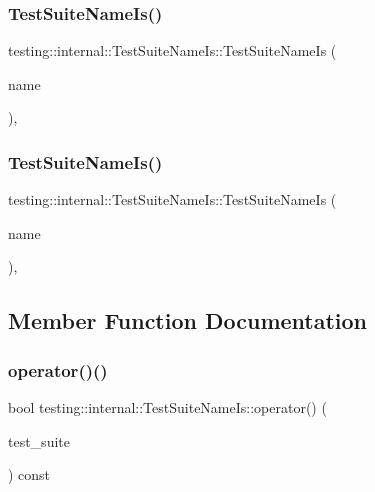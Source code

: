 \subsubsection{\texorpdfstring{TestSuiteNameIs()}{TestSuiteNameIs()}\hspace{0.1cm}{\footnotesize\ttfamily [1/2]}}
{\footnotesize\ttfamily testing\+::internal\+::\+Test\+Suite\+Name\+Is\+::\+Test\+Suite\+Name\+Is (\begin{DoxyParamCaption}\item[{const std\+::string \&}]{name }\end{DoxyParamCaption})\hspace{0.3cm}{\ttfamily [inline]}, {\ttfamily [explicit]}}

\mbox{\label{classtesting_1_1internal_1_1_test_suite_name_is_a7d65a4c117c222adb5512fe09329964f}} 
\subsubsection{\texorpdfstring{TestSuiteNameIs()}{TestSuiteNameIs()}\hspace{0.1cm}{\footnotesize\ttfamily [2/2]}}
{\footnotesize\ttfamily testing\+::internal\+::\+Test\+Suite\+Name\+Is\+::\+Test\+Suite\+Name\+Is (\begin{DoxyParamCaption}\item[{const std\+::string \&}]{name }\end{DoxyParamCaption})\hspace{0.3cm}{\ttfamily [inline]}, {\ttfamily [explicit]}}



\subsection{Member Function Documentation}
\mbox{\label{classtesting_1_1internal_1_1_test_suite_name_is_a28ea67af3de2c5baf0fb70bfdd0784c6}} 
\subsubsection{\texorpdfstring{operator()()}{operator()()}\hspace{0.1cm}{\footnotesize\ttfamily [1/2]}}
{\footnotesize\ttfamily bool testing\+::internal\+::\+Test\+Suite\+Name\+Is\+::operator() (\begin{DoxyParamCaption}\item[{const \mbox{\hyperlink{classtesting_1_1_test_suite}{Test\+Suite}} $\ast$}]{test\+\_\+suite }\end{DoxyParamCaption}) const\hspace{0.3cm}{\ttfamily [inline]}}

